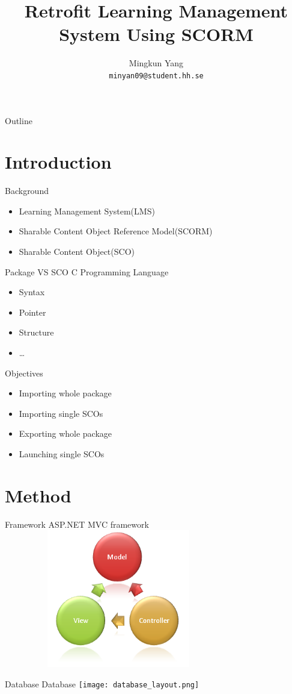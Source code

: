 \documentclass{beamer}
\title{Retrofit Learning Management System Using SCORM}
\author{Mingkun Yang \\
\texttt{minyan09@student.hh.se}}
\institute{
Halmstad University\\
}
\date{}
\begin{document}
\begin{frame}
	\titlepage
\end{frame}

\begin{frame}{Outline}
	\tableofcontents[pausesections]
\end{frame}

\section{Introduction}
\begin{frame}{Background}
	\begin{itemize}
		\item
			Learning Management System(LMS)
			\pause
		\item
			Sharable Content Object Reference Model(SCORM)
			\pause
		\item
			Sharable Content Object(SCO)
	\end{itemize}
\end{frame}
\begin{frame}{Package VS SCO}
	C Programming Language
	\begin{itemize}
		\item
			Syntax
		\item
			Pointer
		\item
			Structure
		\item
			\ldots
	\end{itemize}
\end{frame}
\begin{frame}{Objectives}
	\begin{itemize}
		\item
			Importing whole package
		\item
			Importing single SCOs
		\item
			Exporting whole package
		\item
			Launching single SCOs
	\end{itemize}
\end{frame}

\section{Method}
\begin{frame}{Framework}
	ASP.NET MVC framework
	\includegraphics[width=100mm, height=60mm]{mvc_framework.png}
\end{frame}
\begin{frame}{Database}
	Database
	\hspace*{-5mm}
	\texttt{[image: database\_layout.png]}
\end{frame}
\end{document}
